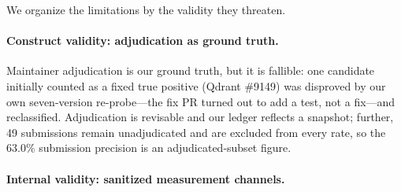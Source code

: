 \documentclass[acmsmall,screen,review,anonymous]{acmart}
\begin{document}
We organize the limitations by the validity they threaten.

\paragraph{Construct validity: adjudication as ground truth.}
Maintainer adjudication is our ground truth, but it is fallible: one candidate initially counted as a fixed true positive (Qdrant \#9149) was disproved by our own seven-version re-probe---the fix PR turned out to add a test, not a fix---and reclassified. Adjudication is revisable and our ledger reflects a snapshot; further, 49 submissions remain unadjudicated and are excluded from every rate, so the 63.0\% submission precision is an adjudicated-subset figure.

\paragraph{Internal validity: sanitized measurement channels.}
\end{document}

